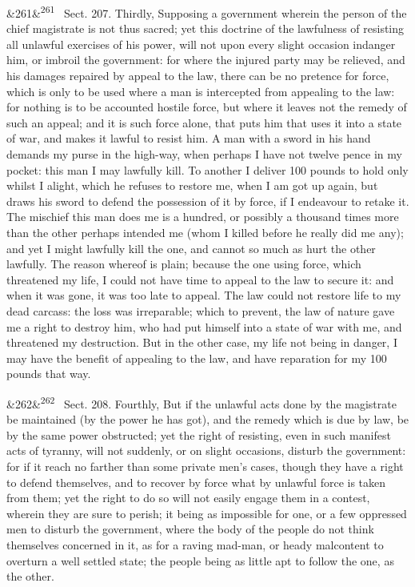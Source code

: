 \documentclass[12pt]{article}
\newcommand{\para}[1][]{\par\noindent\ifx&#1&\else\textsuperscript{\footnotesize #1}~\fi}
\begin{document}
\para[261] Sect. 207. Thirdly, Supposing a government wherein the person of the chief magistrate is not thus sacred; yet this doctrine of the lawfulness of resisting all unlawful exercises of his power, will not upon every slight occasion indanger him, or imbroil the government: for where the injured party may be relieved, and his damages repaired by appeal to the law, there can be no pretence for force, which is only to be used where a man is intercepted from appealing to the law: for nothing is to be accounted hostile force, but where it leaves not the remedy of such an appeal; and it is such force alone, that puts him that uses it into a state of war, and makes it lawful to resist him. A man with a sword in his hand demands my purse in the high-way, when perhaps I have not twelve pence in my pocket: this man I may lawfully kill. To another I deliver 100 pounds to hold only whilst I alight, which he refuses to restore me, when I am got up again, but draws his sword to defend the possession of it by force, if I endeavour to retake it. The mischief this man does me is a hundred, or possibly a thousand times more than the other perhaps intended me (whom I killed before he really did me any); and yet I might lawfully kill the one, and cannot so much as hurt the other lawfully. The reason whereof is plain; because the one using force, which threatened my life, I could not have time to appeal to the law to secure it: and when it was gone, it was too late to appeal. The law could not restore life to my dead carcass: the loss was irreparable; which to prevent, the law of nature gave me a right to destroy him, who had put himself into a state of war with me, and threatened my destruction. But in the other case, my life not being in danger, I may have the benefit of appealing to the law, and have reparation for my 100 pounds that way.

\para[262] Sect. 208. Fourthly, But if the unlawful acts done by the magistrate be maintained (by the power he has got), and the remedy which is due by law, be by the same power obstructed; yet the right of resisting, even in such manifest acts of tyranny, will not suddenly, or on slight occasions, disturb the government: for if it reach no farther than some private men's cases, though they have a right to defend themselves, and to recover by force what by unlawful force is taken from them; yet the right to do so will not easily engage them in a contest, wherein they are sure to perish; it being as impossible for one, or a few oppressed men to disturb the government, where the body of the people do not think themselves concerned in it, as for a raving mad-man, or heady malcontent to overturn a well settled state; the people being as little apt to follow the one, as the other.
\end{document}
